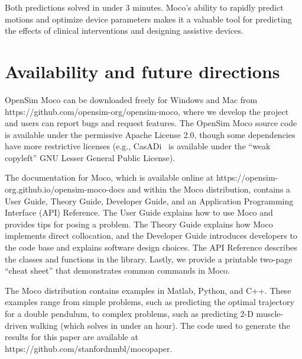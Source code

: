 \documentclass[10pt,letterpaper]{article}
\begin{document}
Both predictions solved in under 3 minutes. Moco’s ability to rapidly predict motions and optimize device parameters makes it a valuable tool for predicting the effects of clinical interventions and designing assistive devices.


\section*{Availability and future directions}

OpenSim Moco can be downloaded freely for Windows and Mac from https://github.com/opensim-org/opensim-moco, where we develop the project and users can report bugs and request features. The OpenSim Moco source code is available under the permissive Apache License 2.0, though some dependencies have more restrictive licenses (e.g., CasADi~\cite{Andersson:2019} is available under the “weak copyleft” GNU Lesser General Public License).

The documentation for Moco, which is available online at https://opensim-org.github.io/opensim-moco-docs and within the Moco distribution, contains a User Guide, Theory Guide, Developer Guide, and an Application Programming Interface (API) Reference. The User Guide explains how to use Moco and provides tips for posing a problem. The Theory Guide explains how Moco implements direct collocation, and the Developer Guide introduces developers to the code base and explains software design choices. The API Reference describes the classes and functions in the library. Lastly, we provide a printable two-page “cheat sheet” that demonstrates common commands in Moco.

The Moco distribution contains examples in Matlab, Python, and C++. These examples range from simple problems, such as predicting the optimal trajectory for a double pendulum, to complex problems, such as predicting 2-D muscle-driven walking (which solves in under an hour). The code used to generate the results for this paper are available at https://github.com/stanfordnmbl/mocopaper.
\end{document}
